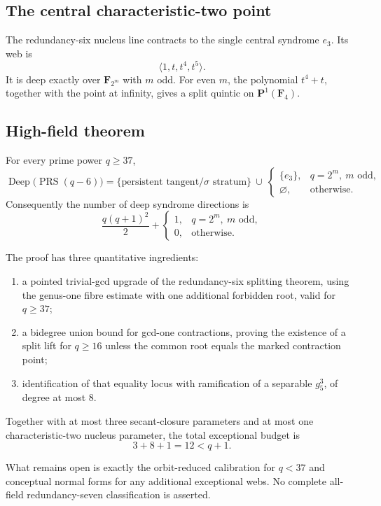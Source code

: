 \documentclass[11pt]{article}
\newcommand{\F}{\mathbf F}
\newcommand{\PRS}{\operatorname{PRS}}
\newcommand{\Deep}{\operatorname{Deep}}
\begin{document}
\subsection{The central characteristic-two point}

The redundancy-six nucleus line contracts to the single central syndrome
$e_3$.  Its web is
\[
 \langle1,t,t^4,t^5\rangle.
\]
It is deep exactly over $\F_{2^m}$ with $m$ odd.  For even $m$, the
polynomial $t^4+t$, together with the point at infinity, gives a split
quintic on $\mathbf P^1(\F_4)$.

\subsection{High-field theorem}

For every prime power $q\geq37$,
\[
\Deep\bigl(\PRS(q-6)\bigr)
=
\{\text{persistent tangent/$\sigma$ stratum}\}
\ \cup\
\begin{cases}
\{e_3\},&q=2^m,\ m\text{ odd},\\
\varnothing,&\text{otherwise}.
\end{cases}
\]
Consequently the number of deep syndrome directions is
\[
 \frac{q(q+1)^2}{2}
 +
 \begin{cases}
 1,&q=2^m,\ m\text{ odd},\\
 0,&\text{otherwise}.
 \end{cases}
\]

The proof has three quantitative ingredients:
\begin{enumerate}
\item a pointed trivial-gcd upgrade of the redundancy-six splitting
theorem, using the genus-one fibre estimate with one additional forbidden
root, valid for $q\geq37$;
\item a bidegree union bound for gcd-one contractions, proving the
existence of a split lift for $q\geq16$ unless the common root equals the
marked contraction point;
\item identification of that equality locus with ramification of a
separable $g^3_5$, of degree at most $8$.
\end{enumerate}
Together with at most three secant-closure parameters and at most one
characteristic-two nucleus parameter, the total exceptional budget is
\[
 3+8+1=12<q+1.
\]

What remains open is exactly the orbit-reduced calibration for $q<37$ and
conceptual normal forms for any additional exceptional webs.  No complete
all-field redundancy-seven classification is asserted.
\end{document}
